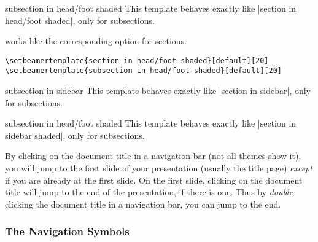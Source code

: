 \begin{element}{subsection in head/foot shaded}\yes\no\no
  This template behaves exactly like |section in head/foot shaded|,
  only for subsections. 
  \begin{templateoptions}
    works like the corresponding option for sections.

    \example
\begin{verbatim}
\setbeamertemplate{section in head/foot shaded}[default][20]
\setbeamertemplate{subsection in head/foot shaded}[default][20]
\end{verbatim}
  \end{templateoptions}
\end{element}

\begin{element}{subsection in sidebar}\yes\yes\yes
  This template behaves exactly like |section in sidebar|, only for
  subsections. 
\end{element}

\begin{element}{subsection in head/foot shaded}\yes\no\no
  This template behaves exactly like |section in sidebar shaded|,
  only for subsections. 
\end{element}

By clicking on the document title in a navigation bar (not all themes
show it), you will jump to the first slide of your presentation
(usually the title page) \emph{except} if you are already at the first
slide. On the first slide, clicking on the document title will jump to
the end of the presentation, if there is one. Thus by \emph{double}
clicking the document title in a navigation bar, you can jump to the end.



\subsubsection{The Navigation Symbols}
\label{section-navigation-symbols}


